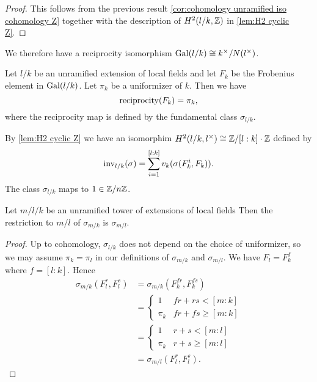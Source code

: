 \begin{proof}
	This follows from the previous result \ref{cor:cohomology unramified iso cohomology Z}
	together with the description of $H^2(l/k,{\mathbb Z})$ in \ref{lem:H2 cyclic Z}.
\end{proof}


We therefore have a reciprocity isomorphism $\mathrm{Gal}(l/k) \cong k^\times / N(l^\times)$.

\begin{lemma}
	Let $l/k$ be an unramified extension of local fields and let $F_k$ be the Frobenius
	element in $\mathrm{Gal}(l/k)$. Let $\pi_k$ be a uniformizer of $k$. Then we have
	\[
		\mathrm{reciprocity} (F_k)= \pi_k,
	\]
	where the reciprocity map is defined by the fundamental class $\sigma_{l/k}$.
\end{lemma}

By \ref{lem:H2 cyclic Z} we have an isomorphim $H^2(l/k, l^\times) \cong {\mathbb Z} / [l:k]\cdot {\mathbb Z}$
defined by
\[
	\mathrm{inv}_{l/k}(\sigma) = \sum_{i=1}^{[l:k]} v_k(\sigma(F_k^i, F_k)).
\]
The class $\sigma_{l/k}$ maps to $1 \in {\mathbb Z}/n{\mathbb Z}$.







\begin{lemma}
	Let $m / l / k$ be an unramified tower of extensions of local fields
	Then the restriction to $m/l$ of $\sigma_{m/k}$ is $\sigma_{m/l}$.
\end{lemma}

\begin{proof}
	Up to cohomology, $\sigma_{l/k}$ does not depend on the choice of
	uniformizer, so we may assume $\pi_k=\pi_l$
	in our definitions of $\sigma_{m/k}$ and $\sigma_{m/l}$.
	We have $F_l = F_k^f$ where $f = [l:k]$.
	Hence
	\begin{align*}
		\sigma_{m/k}(F_l^r, F_l^s)
		&=
		\sigma_{m/k}(F_k^{fr}, F_k^{fs})\\
		&=
		\begin{cases}
			1 & fr + rs < [m:k] \\
			\pi_k & fr + fs \ge [m:k]
		\end{cases}\\
		&=
		\begin{cases}
			1 & r + s < [m:l] \\
			\pi_k & r + s \ge [m:l]
		\end{cases}\\
		&=\sigma_{m/l}(F_l^r,F_l^s).
	\end{align*}
\end{proof}






